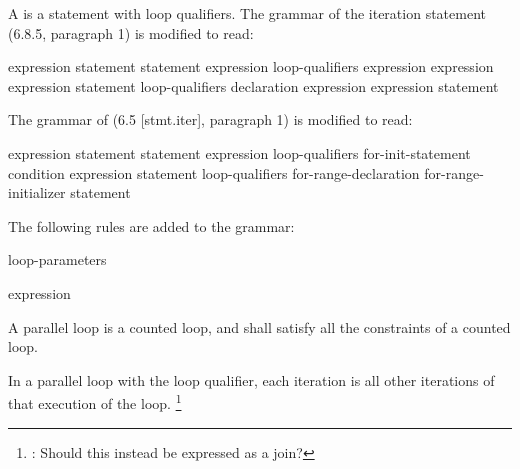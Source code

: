 
\pnum
A
is a
statement with loop qualifiers.
The grammar of the iteration statement (6.8.5, paragraph 1)
is modified to read:

\begin{bnf}
\br
{} \terminal{(} expression \terminal{)} statement
\br
{} statement  \terminal{(} expression \terminal{)} \terminal{;}
\br
loop-qualifiers\opt{}  \terminal{(}
expression\opt{} \terminal{;}
expression\opt{} \terminal{;}
expression\opt{} \terminal{)} statement
\br
loop-qualifiers\opt{}  \terminal{(}
declaration
expression\opt{} \terminal{;}
expression\opt{} \terminal{)} statement
\end{bnf}

\begin{cpp}
The grammar of
(6.5 [stmt.iter], paragraph 1)
is modified to read:

\begin{bnf}
\br
{} \terminal{(} expression \terminal{)} statement
\br
{} statement  \terminal{(} expression \terminal{)} \terminal{;}
\br
loop-qualifiers\opt{}  \terminal{(}
for-init-statement
condition\opt{} \terminal{;}
expression\opt{} \terminal{)} statement
\br
loop-qualifiers\opt{}  \terminal{(}
for-range-declaration \terminal{:}
for-range-initializer \terminal{)} statement
\end{bnf}

\end{cpp}

\pnum
The following rules are added to the grammar:

\begin{bnf}
\br
{} loop-parameters\opt
\end{bnf}

\begin{bnf}
\br
\terminal{[} expression \terminal{]}
\end{bnf}

\pnum
A parallel loop is a counted loop,
and shall satisfy all the constraints of a counted loop.

\pnum
In a parallel loop with the
loop qualifier,
each iteration is
all other iterations of that execution of the loop.
\footnote{:
Should this instead be expressed as a join?
}

